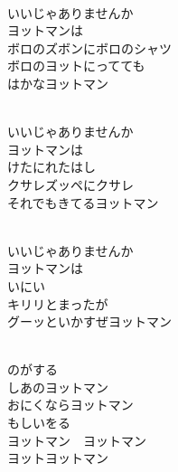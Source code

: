 \documentclass[10pt,b5j]{tarticle} %
\begin{document}
\begin{enumerate}
\begin{minipage}[c]{\blocksize}
        \vspace{\linespace}
        \item~\\
        いいじゃありませんか\\
        ヨットマンは\\
        ボロのズボンにボロのシャツ\\
        ボロのヨットにってても\\
        はかなヨットマン
        
    \end{minipage}
    \begin{minipage}[c]{\blocksize}
        
        \vspace{\linespace}
        \item~\\
        いいじゃありませんか\\
        ヨットマンは\\
        けたにれたはし\\
        クサレズッペにクサレ\\
        それでもきてるヨットマン
        
    \end{minipage}
    \begin{minipage}[c]{\blocksize}
        
        \vspace{\linespace}
        \item~\\
        いいじゃありませんか\\
        ヨットマンは\\
        いにい\\
        キリリとまったが\\
        グーッといかすぜヨットマン
        
    \end{minipage}
    \begin{minipage}[c]{\blocksize}
        
        \vspace{\linespace}
        \item~\\
        のがする\\
        しあのヨットマン\\
        おにくならヨットマン\\
        もしいをる\\
        ヨットマン　ヨットマン\\
        ヨットヨットマン
    
    \end{minipage}
\end{enumerate} %
\end{document}
